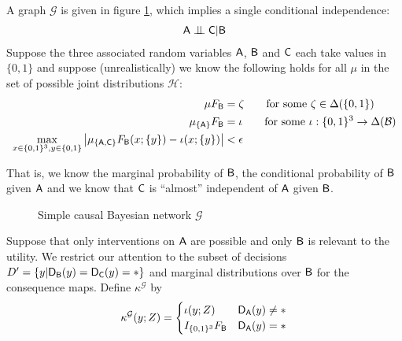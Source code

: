 \begin{example}\label{ex:extn_cbn}

A graph $\mathcal{G}$ is given in figure \ref{fig:simple_cbn}, which implies a single conditional independence:
\begin{align}
    \RV{A}\CI \RV{C}|\RV{B} \label{eq:g_ci}
\end{align}
Suppose the three associated random variables $\mathsf{A}$, $\mathsf{B}$ and $\mathsf{C}$ each take values in $\{0,1\}$ and suppose (unrealistically) we know the following holds for all $\mu$ in the set of possible joint distributions $\mathscr{H}$:
\begin{align}
    \mu F_{\mathsf{B}} &= \zeta \qquad \text{for some } \zeta\in \Delta(\{0,1\})\\
    \mu_{\{\mathsf{A}\}} F_{\mathsf{B}} &= \iota \qquad \text{for some }\iota:\{0,1\}^3\to \Delta(\mathcal{B})\\
    \max_{x\in\{0,1\}^3,y\in\{0,1\}}\left|\mu_{\{\mathsf{A},\mathsf{C}\}} F_{\mathsf{B}}(x;\{y\}) - \iota(x;\{y\}) \right| &< \epsilon \label{eq:app_ci}
\end{align}

That is, we know the marginal probability of $\mathsf{B}$, the conditional probability of $\mathsf{B}$ given $\mathsf{A}$ and we know that $\mathsf{C}$ is ``almost'' independent of $\mathsf{A}$ given $\mathsf{B}$.

\begin{figure}
    \centering
    \caption{Simple causal Bayesian network $\mathcal{G}$}
    \label{fig:simple_cbn}
\end{figure}

Suppose that only interventions on $\mathsf{A}$ are possible and only $\mathsf{B}$ is relevant to the utility. We restrict our attention to the subset of decisions $D'=\{y|\mathsf{D}_{\mathsf{B}}(y)=\mathsf{D}_{\mathsf{C}}(y)=*\}$ and marginal distributions over $\mathsf{B}$ for the consequence maps. Define $\kappa^{\mathcal{G}}$ by
\begin{align}
    \kappa^{\mathcal{G}}(y;Z) = \begin{cases} \iota(y;Z) & \mathsf{D}_{\mathsf{A}}(y) \neq *\\
                                              I_{\{0,1\}^3} F_{\mathsf{B}} & \mathsf{D}_{\mathsf{A}}(y) = *\end{cases}
\end{align}


\end{example}
